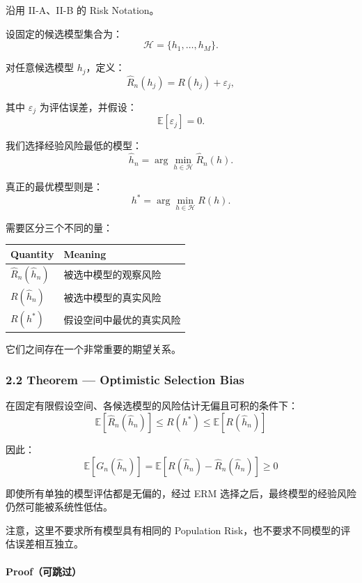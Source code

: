 沿用 II-A、II-B 的 Risk Notation。

设固定的候选模型集合为：
\[\mathcal H=\{h_1,\ldots,h_M\}.\]

对任意候选模型 \(h_j\)，定义：
\[\widehat R_n(h_j)
=
R(h_j)+\varepsilon_j,\]

其中 \(\varepsilon_j\) 为评估误差，并假设：
\[\mathbb E[\varepsilon_j]=0.\]

我们选择经验风险最低的模型：
\[\hat h_n=
\arg\min_{h\in\mathcal H}\widehat R_n(h).\]

真正的最优模型则是：
\[h^*=
\arg\min_{h\in\mathcal H}R(h).\]

需要区分三个不同的量：

\begin{readertable}
\begin{longtable}[]{@{}
  >{\raggedright\arraybackslash}p{}
  >{\raggedright\arraybackslash}p{}@{}}
\toprule
Quantity & Meaning \\
\midrule
\endhead
\(\widehat R_n(\hat h_n)\) & 被选中模型的观察风险 \\
\(R(\hat h_n)\) & 被选中模型的真实风险 \\
\(R(h^*)\) & 假设空间中最优的真实风险 \\
\bottomrule
\end{longtable}
\end{readertable}

它们之间存在一个非常重要的期望关系。

\hypertarget{part-2-16-0001-theorem-optimistic-selection-bias}{%
\subsubsection{2.2 Theorem --- Optimistic Selection Bias}\label{part-2-16-0001-theorem-optimistic-selection-bias}}

在固定有限假设空间、各候选模型的风险估计无偏且可积的条件下：
\[\boxed{
\mathbb E[\widehat R_n(\hat h_n)]
\leq
R(h^*)
\leq
\mathbb E[R(\hat h_n)]
}\]

因此：
\[\boxed{
\mathbb E[G_n(\hat h_n)]
=
\mathbb E[R(\hat h_n)-\widehat R_n(\hat h_n)]
\geq0
}\]

即使所有单独的模型评估都是无偏的，经过 ERM 选择之后，最终模型的经验风险仍然可能被系统性低估。

注意，这里不要求所有模型具有相同的 Population Risk，也不要求不同模型的评估误差相互独立。

\hypertarget{part-2-16-0001-proofux53efux8df3ux8fc7}{%
\paragraph{Proof（可跳过）}\label{part-2-16-0001-proofux53efux8df3ux8fc7}}

